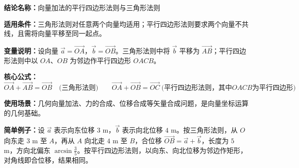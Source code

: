 \textbf{结论名称：}向量加法的平行四边形法则与三角形法则

\textbf{适用条件：}三角形法则对任意两个向量均适用；平行四边形法则要求两个向量不共线，且需将向量平移至同一起点。

\textbf{变量说明：}设向量 $\vec{a} = \overrightarrow{OA}$，$\vec{b} = \overrightarrow{OB}$。三角形法则中将 $\vec{b}$ 平移为 $\overrightarrow{AB}$；平行四边形法则中以 $OA$、$OB$ 为邻边作平行四边形 $OACB$。

\textbf{核心公式：}
\[
\boxed{\overrightarrow{OA} + \overrightarrow{AB} = \overrightarrow{OB}}\quad\text{(三角形法则)}\qquad
\boxed{\overrightarrow{OA} + \overrightarrow{OB} = \overrightarrow{OC}}\ \text{(平行四边形法则，其中$OACB$为平行四边形)}
\]

\textbf{使用场景：}几何向量加法、力的合成、位移合成等矢量合成问题，是向量坐标运算的几何基础。

\textbf{简单例子：}设 $\vec{a}$ 表示向东位移 $3$ m，$\vec{b}$ 表示向北位移 $4$ m。按三角形法则，从 $O$ 向东走 $3$ m 至 $A$，再从 $A$ 向北走 $4$ m 至 $B$，合位移 $\overrightarrow{OB} = \vec{a} + \vec{b}$，长度为 $5$ m，方向北偏东 $\arcsin\frac{3}{5}$。按平行四边形法则，以向东、向北位移为邻边作矩形，对角线即合位移，结果相同。